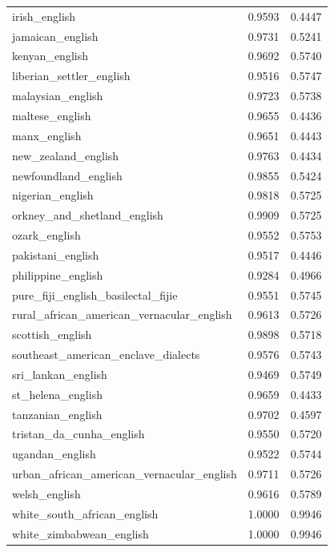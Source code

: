 \begin{landscape}
\begin{longtable}{lcc}
irish\_english & 0.9593 & 0.4447 \\
jamaican\_english & 0.9731 & 0.5241 \\
kenyan\_english & 0.9692 & 0.5740 \\
liberian\_settler\_english & 0.9516 & 0.5747 \\
malaysian\_english & 0.9723 & 0.5738 \\
maltese\_english & 0.9655 & 0.4436 \\
manx\_english & 0.9651 & 0.4443 \\
new\_zealand\_english & 0.9763 & 0.4434 \\
newfoundland\_english & 0.9855 & 0.5424 \\
nigerian\_english & 0.9818 & 0.5725 \\
orkney\_and\_shetland\_english & 0.9909 & 0.5725 \\
ozark\_english & 0.9552 & 0.5753 \\
pakistani\_english & 0.9517 & 0.4446 \\
philippine\_english & 0.9284 & 0.4966 \\
pure\_fiji\_english\_basilectal\_fijie & 0.9551 & 0.5745 \\
rural\_african\_american\_vernacular\_english & 0.9613 & 0.5726 \\
scottish\_english & 0.9898 & 0.5718 \\
southeast\_american\_enclave\_dialects & 0.9576 & 0.5743 \\
sri\_lankan\_english & 0.9469 & 0.5749 \\
st\_helena\_english & 0.9659 & 0.4433 \\
tanzanian\_english & 0.9702 & 0.4597 \\
tristan\_da\_cunha\_english & 0.9550 & 0.5720 \\
ugandan\_english & 0.9522 & 0.5744 \\
urban\_african\_american\_vernacular\_english & 0.9711 & 0.5726 \\
welsh\_english & 0.9616 & 0.5789 \\
white\_south\_african\_english & 1.0000 & 0.9946 \\
white\_zimbabwean\_english & 1.0000 & 0.9946 \\
\bottomrule
\end{longtable}
\end{landscape}